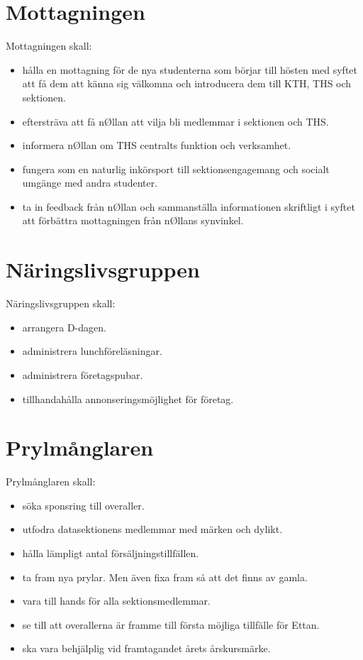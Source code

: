 \documentclass[a4paper]{article}
\begin{document}
\section{Mottagningen}
Mottagningen skall:
\begin{itemize}
\item hålla en mottagning för de nya studenterna som börjar till hösten med syftet att få dem att känna sig välkomna och introducera dem till KTH, THS och sektionen.
\item eftersträva att få n\O llan att vilja bli medlemmar i sektionen och THS.
\item informera n\O llan om THS centralts funktion och verksamhet.
\item fungera som en naturlig inkörsport till sektionsengagemang och socialt umgänge med andra studenter.
\item ta in feedback från n\O llan och sammanställa informationen skriftligt i syftet att förbättra mottagningen från n\O llans synvinkel.
\end{itemize}

\section{Näringslivsgruppen} 
Näringslivsgruppen skall:
\begin{itemize}
\item arrangera D-dagen.
\item administrera lunchföreläsningar.
\item administrera företagspubar.
\item tillhandahålla annonseringsmöjlighet för företag.
\end{itemize}

\section{Prylmånglaren} 
Prylmånglaren skall:
\begin{itemize}
\item söka sponsring till overaller.
\item utfodra datasektionens medlemmar med märken och dylikt.
\item hålla lämpligt antal försäljningstillfällen.
\item ta fram nya prylar. Men även fixa fram så att det finns av gamla.
\item vara till hands för alla sektionsmedlemmar.
\item se till att overallerna är framme till första möjliga tillfälle för Ettan.
\item ska vara behjälplig vid framtagandet årets årskursmärke.
\end{itemize}
\end{document}
